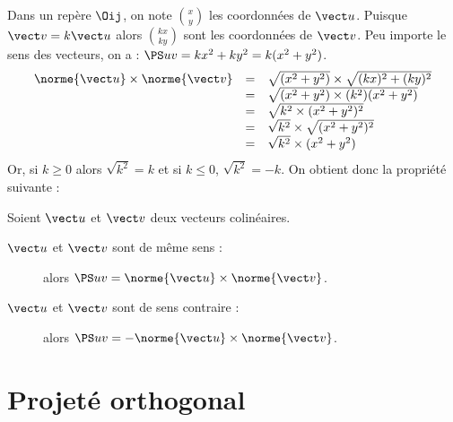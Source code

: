 \documentclass[10pt,openright,twoside,french]{book}
\begin{document}
Dans un repère $\Oij$, on note $\binom x y$ les coordonnées de $\vect u$. Puisque $\vect v = k\vect u$ alors $\binom{kx}{ky}$ sont les coordonnées de $\vect v$. Peu importe le sens des vecteurs, on a :
$\PS u v = kx^2 + ky^2 = k(x^2 + y^2)$.
    \[\begin{array}{rcl}
        \norme{\vect u} \times \norme{\vect v} & = & \sqrt{(x^2 + y^2)} \times \sqrt{(kx)^2 + (ky)^2} \\
                                                                     & = & \sqrt{(x^2 + y^2) \times (k^2)(x^2 + y^2)} \\
                                                                     & = & \sqrt{k^2 \times (x^2 + y^2)^2} \\
                                                                     & = & \sqrt{k^2} \times \sqrt{(x^2 + y^2)^2} \\
                                                                     & = & \sqrt{k^2} \times (x^2 + y^2)
    \end{array}\]
Or, si $k \geq 0$ alors $\sqrt{k^2} = k$ et si $k \leq 0$, $\sqrt{k^2} = -k$. On obtient donc la propriété suivante :

\begin{Prop}
    Soient $\vect u$ et $\vect v$ deux vecteurs colinéaires.\par
    \begin{description}
        \item[$\vect u$ et $\vect v$ sont de même sens :] alors $\PS u v = \norme{\vect u} \times\norme{\vect v}$.
        \item[$\vect u$ et $\vect v$ sont de sens contraire :] alors $\PS u v = -\norme{\vect u} \times\norme{\vect v}$.
    \end{description}
\end{Prop}

\section{Projeté orthogonal}
\end{document}
